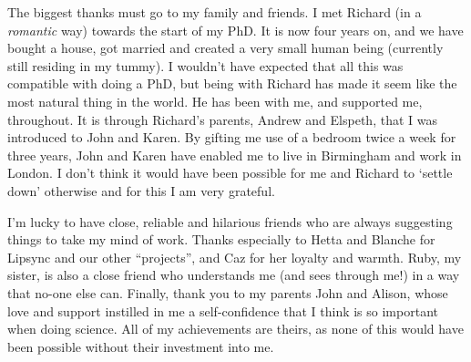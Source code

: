 The biggest thanks must go to my family and friends. I met Richard (in a \textit{romantic} way) towards the start of my PhD. It is now four years on, and we have bought a house, got married and created a very small human being (currently still residing in my tummy). I wouldn't have expected that all this was compatible with doing a PhD, but being with Richard has made it seem like the most natural thing in the world. He has been with me, and supported me, throughout. It is through Richard's parents, Andrew and Elspeth, that I was introduced to John and Karen. By gifting me use of a bedroom twice a week for three years, John and Karen have enabled me to live in Birmingham and work in London. I don't think it would have been possible for me and Richard to `settle down' otherwise and for this I am very grateful.

I'm lucky to have close, reliable and hilarious friends who are always suggesting things to take my mind of work. Thanks especially to Hetta and Blanche for Lipsync and our other ``projects'', and Caz for her loyalty and warmth. Ruby, my sister, is also a close friend who understands me (and sees through me!) in a way that no-one else can. Finally, thank you to my parents John and Alison, whose love and support instilled in me a self-confidence that I think is so important when doing science. All of my achievements are theirs, as none of this would have been possible without their investment into me.